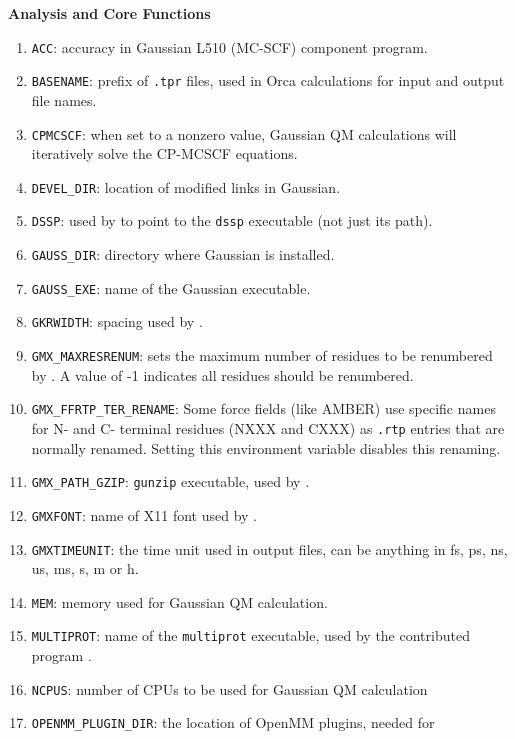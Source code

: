 {\bf Analysis and Core Functions}

\begin{enumerate}

\item   {\tt ACC}: accuracy in Gaussian L510 (MC-SCF) component program.
\item   {\tt BASENAME}: prefix of {\tt .tpr} files, used in Orca calculations
        for input and output file names.
\item   {\tt CPMCSCF}: when set to a nonzero value, Gaussian QM calculations will
        iteratively solve the CP-MCSCF equations.
\item   {\tt DEVEL_DIR}: location of modified links in Gaussian.
\item   {\tt DSSP}: used by {\tt {}} to point to the {\tt dssp}
        executable (not just its path).
\item   {\tt GAUSS_DIR}: directory where Gaussian is installed.
\item   {\tt GAUSS_EXE}: name of the Gaussian executable.
\item   {\tt GKRWIDTH}: spacing used by {\tt {}}.
\item   {\tt GMX_MAXRESRENUM}: sets the maximum number of residues to be renumbered by
        {\tt {}}. A value of -1 indicates all residues should be renumbered.
\item   {\tt GMX_FFRTP_TER_RENAME}: Some force fields (like AMBER) use specific names for N- and C-
        terminal residues (NXXX and CXXX) as {\tt .rtp} entries that are normally renamed. Setting
        this environment variable disables this renaming.
\item   {\tt GMX_PATH_GZIP}: {\tt gunzip} executable, used by {\tt {}}.
\item   {\tt GMXFONT}: name of X11 font used by {\tt {}}.
\item   {\tt GMXTIMEUNIT}: the time unit used in output files, can be
        anything in fs, ps, ns, us, ms, s, m or h.
\item   {\tt MEM}: memory used for Gaussian QM calculation.
\item   {\tt MULTIPROT}: name of the {\tt multiprot} executable, used by the
        contributed program {\tt {}}.
\item   {\tt NCPUS}: number of CPUs to be used for Gaussian QM calculation
\item   {\tt OPENMM_PLUGIN_DIR}: the location of OpenMM plugins, needed for

\end{enumerate}
